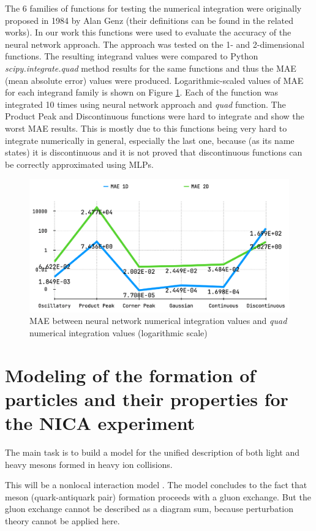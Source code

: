 \documentclass[%
]{ittmm}
\begin{document}
The 6 families of functions for testing the numerical integration were originally proposed in 1984 by Alan Genz\cite{genz} (their definitions can be found in the related works). In our work this functions were used to evaluate the accuracy of the neural network approach. The approach was tested on the 1- and 2-dimensional functions. The resulting integrand values were compared to Python \textit{scipy.integrate.quad} method results for the same functions and thus the MAE (mean absolute error) values were produced. Logarithmic-scaled values of MAE for each integrand family is shown on Figure \ref{fig:genz-tests}. Each of the function was integrated 10 times using neural network approach and \textit{quad} function. The Product Peak and Discontinuous functions were hard to integrate and show the worst MAE results. This is mostly due to this functions being very hard to integrate numerically in general, especially the last one, because (as its name states) it is discontinuous and it is not proved that discontinuous functions can be correctly approximated using MLPs. 

\begin{figure}
\centering
\includegraphics[width=0.85\linewidth]{maes.png}
\caption{ MAE between neural network numerical integration values and \textit{quad} numerical integration values (logarithmic scale)}
\label{fig:genz-tests}
\end{figure}


\section{Modeling of the formation of particles and their properties for the NICA experiment}

The main task is to build a model for the unified description of both light and heavy mesons formed in heavy ion collisions.

 This will be a nonlocal interaction model \cite{schmidt, costa}. 
 The model concludes to the fact that meson (quark-antiquark pair) formation proceeds with a gluon exchange. But the gluon exchange cannot be described as a diagram sum, because perturbation theory cannot be applied here. 
 
\end{document}
